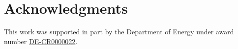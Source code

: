 \documentclass[running heads]{llncs}
\begin{document}

\section*{Acknowledgments}
This work was supported in part by the Department of Energy under award number \href{https://doi.org/10.13039/100000015}{DE-CR0000022}.


\printbibliography
\end{document}
